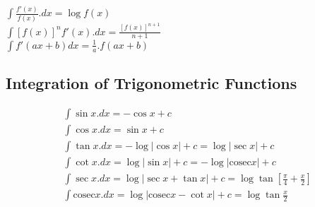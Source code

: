 \vspace{2mm}

\begin{tcolorbox}
\begin{center}
$ \int \frac{f'(x)}{f(x)}.dx = \log{f(x)} $ \\
$ \int [f(x)]^n f'(x).dx = \frac{[f(x)]^{n+1}}{n+1} $ \\
$ \int f'(ax+b)dx = \frac{1}{a}.{f(ax+b)} $
\end{center}
\end{tcolorbox}

\subsection{Integration of Trigonometric Functions}
\begin{align*}
&\int \sin x.dx = -\cos x + c \\[2mm]
&\int \cos x.dx = \sin x + c \\[2mm]
&\int \tan x.dx = -\log |\cos x| + c = \log |\sec x| + c \\[2mm]
&\int \cot x.dx =  \log |\sin x| + c =  -\log |\mathrm{cosec} x| + c \\[2mm]
&\int \sec x.dx = \log |\sec x + \tan x| + c = \log \tan \left[\frac{\pi}{4} + \frac{x}{2} \right] \\[2mm]
&\int \mathrm{cosec} x.dx = \log |\mathrm{cosec}x - \cot x| + c = \log \tan \frac{x}{2}
\end{align*}